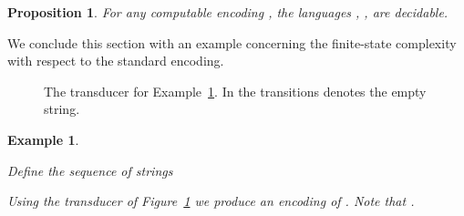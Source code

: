 \documentclass[copyright]{eptcs}
\newtheorem{example}{Example}[section]
\newtheorem{proposition}[theorem]{Proposition}
\begin{document}
\begin{proposition}
\label{prop61}
For any computable encoding
, the languages , , are decidable.
\end{proposition}

We conclude this section with an example concerning the finite-state
complexity with respect to the standard encoding. 

\begin{figure}[ht]
\hspace*{\fill}
\epsfxsize=15cm
\hspace*{\fill}
\caption{
\label{ratta}
The transducer  for Example~\ref{latta}.
In the transitions  denotes the empty string.
}
\end{figure}
\fi

\begin{example}
\label{latta}
{\normalfont 
Define the sequence of strings 

Using the transducer  of Figure~\ref{ratta} we produce 
an encoding of . Note that . 


}
\end{example}
\end{document}
